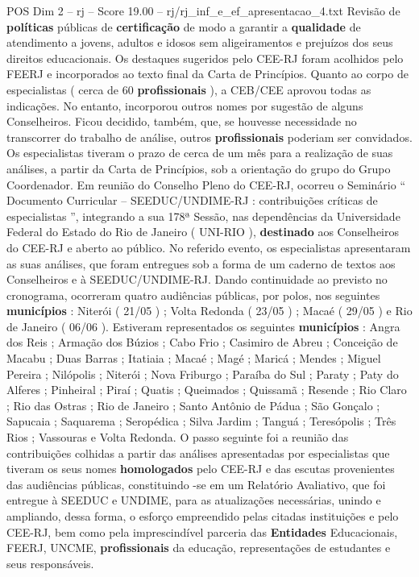\begin{textsample}{POS Dim 2 – rj – Score 19.00 – rj/rj\_inf\_e\_ef\_apresentacao\_4.txt}
Revisão de \textbf{políticas} públicas de \textbf{certificação} de modo a garantir a \textbf{qualidade} de atendimento a jovens, adultos e idosos sem aligeiramentos e prejuízos dos seus direitos educacionais.
Os destaques sugeridos pelo CEE-RJ foram acolhidos pelo FEERJ e incorporados ao texto final da Carta de Princípios.
Quanto ao corpo de especialistas ( cerca de 60 \textbf{profissionais} ), a CEB/CEE aprovou todas as indicações.
No entanto, incorporou outros nomes por sugestão de alguns Conselheiros.
Ficou decidido, também, que, se houvesse necessidade no transcorrer do trabalho de análise, outros \textbf{profissionais} poderiam ser convidados.
Os especialistas tiveram o prazo de cerca de um mês para a realização de suas análises, a partir da Carta de Princípios, sob a orientação do grupo do Grupo Coordenador.
Em reunião do Conselho Pleno do CEE-RJ, ocorreu o Seminário “ Documento Curricular – SEEDUC/UNDIME-RJ : contribuições críticas de especialistas ”, integrando a sua 178ª Sessão, nas dependências da Universidade Federal do Estado do Rio de Janeiro ( UNI-RIO ), \textbf{destinado} aos Conselheiros do CEE-RJ e aberto ao público.
No referido evento, os especialistas apresentaram as suas análises, que foram entregues sob a forma de um caderno de textos aos Conselheiros e à SEEDUC/UNDIME-RJ.
Dando continuidade ao previsto no cronograma, ocorreram quatro audiências públicas, por polos, nos seguintes \textbf{municípios} : Niterói ( 21/05 ) ; Volta Redonda ( 23/05 ) ; Macaé ( 29/05 ) e Rio de Janeiro ( 06/06 ).
Estiveram representados os seguintes \textbf{municípios} : Angra dos Reis ; Armação dos Búzios ; Cabo Frio ; Casimiro de Abreu ; Conceição de Macabu ; Duas Barras ; Itatiaia ; Macaé ; Magé ; Maricá ; Mendes ; Miguel Pereira ; Nilópolis ; Niterói ; Nova Friburgo ; Paraíba do Sul ; Paraty ; Paty do Alferes ; Pinheiral ; Piraí ; Quatis ; Queimados ; Quissamã ; Resende ; Rio Claro ; Rio das Ostras ; Rio de Janeiro ; Santo Antônio de Pádua ; São Gonçalo ; Sapucaia ; Saquarema ; Seropédica ; Silva Jardim ; Tanguá ; Teresópolis ; Três Rios ; Vassouras e Volta Redonda.
O passo seguinte foi a reunião das contribuições colhidas a partir das análises apresentadas por especialistas que tiveram os seus nomes \textbf{homologados} pelo CEE-RJ e das escutas provenientes das audiências públicas, constituindo -se em um Relatório Avaliativo, que foi entregue à SEEDUC e UNDIME, para as atualizações necessárias, unindo e ampliando, dessa forma, o esforço empreendido pelas citadas instituições e pelo CEE-RJ, bem como pela imprescindível parceria das \textbf{Entidades} Educacionais, FEERJ, UNCME, \textbf{profissionais} da educação, representações de estudantes e seus responsáveis.

\end{textsample}
